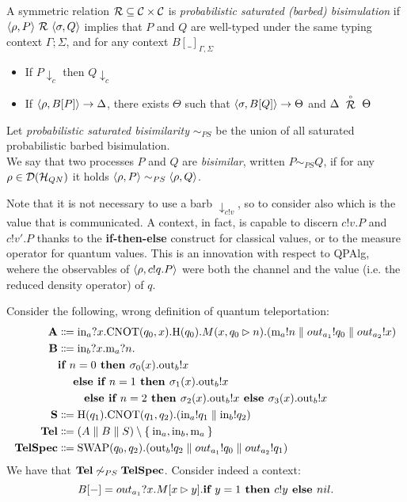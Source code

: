 \begin{definition}
	A symmetric relation $\mathcal{R} \subseteq \mathcal{C} \times \mathcal{C}$ is \emph{probabilistic saturated (barbed) bisimulation} if $\confw{\rho, P} \ \rel\ \confw{\sigma, Q}$ implies that $P$ and $Q$  are well-typed under the same typing context $\Gamma; \Sigma$, and for any context $B[\_]_{\Gamma, \Sigma}$
	\begin{itemize}
		\item If $P \downarrow_{c}$ then $Q \downarrow_{c}$
		\item If $\langle\rho, B[P]\rangle \rightarrow \Delta$, there exists $\Theta$ such that $\langle\sigma, B[Q]\rangle \rightarrow \Theta$ and $\Delta\ \slift{\rel}\ \Theta$
	\end{itemize}
	Let \emph{probabilistic saturated bisimilarity} $\sim_{PS}$ be the union of all saturated probabilistic barbed bisimulation. \\
	We say that two {processes} $P$ and $Q$ are \emph{bisimilar}, written $P \sim_{PS} Q$, if for any $\rho \in \mathcal{D}(\mathcal{H}_{QN})$ it holds $\langle\rho, P\rangle \sim_{PS} \langle\rho, Q\rangle$.
\end{definition}

Note that it is not necessary to use a barb $\downarrow_{c!v}$, so to consider also which is the value that is communicated. A context, in fact, is capable to discern $c!v.P$ and $c!v'.P$ thanks to the \textbf{if-then-else} construct for classical values, or to the measure operator for quantum values. This is an innovation with respect to QPAlg, wehere the observables of $\langle\rho, c!q.P\rangle$ were both the channel and the value (i.e. the reduced density operator) of $q$. 


\begin{example}
	Consider the following, wrong definition of quantum teleportation:
	\begin{align*}
		\text{\textbf{A}} &\Coloneqq \text{in}_a?x.\text{CNOT}(q_0, x).\text{H}(q_0).M(x,q_0 \rhd n).(\text{m}_a!n \parallel out_{a_1}! q_0 \parallel out_{a_2}! x )\\
    \text{\textbf{B}} &\Coloneqq \text{in}_b?x.\text{m}_a?n.
       \\ & \textbf{if } n = 0 \textbf{ then } \sigma_0(x).\text{out}_b!x\\&\quad \textbf{ else } \textbf{if } n = 1 \textbf{ then } \sigma_1(x).\text{out}_b!x\\&\qquad \textbf{ else } \textbf{if } n = 2 \textbf{ then } \sigma_2(x).\text{out}_b!x \textbf{ else } \sigma_3(x).\text{out}_b!x
      \\
		\text{\textbf{S}} &\Coloneqq \text{H}(q_1).\text{CNOT}(q_1, q_2).(\text{in}_a!q_1 \parallel \text{in}_b!q_2) \\
		\text{\textbf{Tel}} &\Coloneqq (A \parallel B \parallel S) \setminus \Set{\text{in}_a, \text{in}_b, \text{m}_a } \\
		\text{\textbf{TelSpec}} &\Coloneqq \text{SWAP}(q_0,q_2).(\text{out}_b!q_2 \parallel out_{a_1}! q_0 \parallel out_{a_2}! q_1)
	\end{align*}
	We have that $\text{\textbf{Tel}} \not\sim_{PS} \text{\textbf{TelSpec}}$.
	Consider indeed a context:
  \[ B[{-}] = out_{a_1} ? x . M[x \rhd y] . \textbf{if } y = 1 \textbf{ then } c!y \textbf{ else } nil. \]
\end{example}




